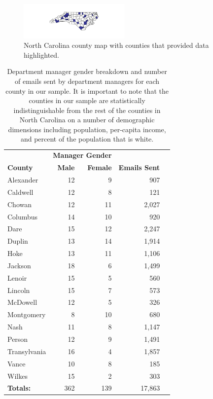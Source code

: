 \documentclass{pnastwo}
\begin{document}
\begin{article}
	\begin{figure}
		\centering
	\caption{\label{fig:nc map} North Carolina county map with counties that provided data highlighted.}	
	\centering
	\includegraphics[width = 0.48\textwidth]{images/County_Map.pdf}
	\end{figure}
	
	\begin{table}
	\centering
		\begin{tabular}{lrrrr}
		  \toprule
		  & \multicolumn{2}{c}{\textbf{Manager Gender}} & \\
		  \cmidrule{2-3}
		 \textbf{County} & \textbf{Male} & \textbf{Female} & \textbf{Emails Sent}  \\
		  \midrule
		Alexander & 12 & 9 & 907   \\
		Caldwell & 12 & 8 & 121     \\
		Chowan & 12 & 11 & 2,027   \\
		Columbus & 14 & 10 & 920   \\
		Dare & 15 & 12 & 2,247    \\
		Duplin & 13 & 14 & 1,914    \\
		Hoke & 13 & 11 & 1,106  \\
		Jackson & 18 & 6 & 1,499    \\
		Lenoir & 15 & 5 & 560  \\
		Lincoln & 15 & 7 & 573   \\
		McDowell & 12 & 5 & 326   \\
		Montgomery & 8 & 10 & 680   \\
		Nash & 11 & 8 & 1,147  \\
		Person & 12 & 9 & 1,491   \\
		Transylvania & 16 & 4 & 1,857  \\
		Vance & 10 & 8 & 185   \\
		Wilkes & 15 & 2 & 303   \\
		   \midrule
		   \textbf{Totals:} & 362 & 139 & 17,863 \\
		   \bottomrule
		\end{tabular}
		\caption{\label{tab:county aggregate stats}Department manager gender breakdown and number of emails sent by department managers for each county in our sample. It is important to note that the counties in our sample are statistically indistinguishable from the rest of the counties in North Carolina on a number of demographic dimensions including population, per-capita income, and percent of the population that is white. \\}
	\end{table}




\end{article}
\end{document}
